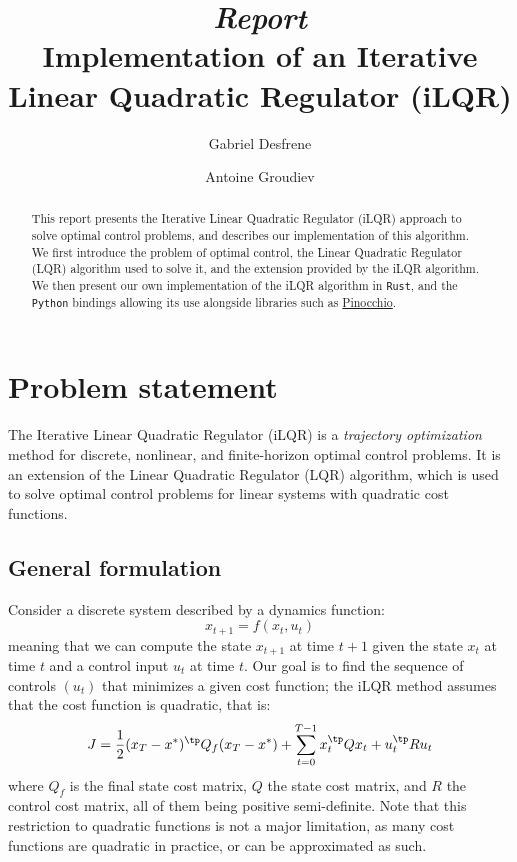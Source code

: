 \documentclass[nodate]{../cs-classes/cs-classes}
\title{\textit{Report}\\Implementation of an Iterative Linear Quadratic Regulator (iLQR)}
\author{Gabriel Desfrene\and Antoine Groudiev}
\begin{document}
\begin{abstract}
    This report presents the Iterative Linear Quadratic Regulator (iLQR) approach to solve optimal control problems, and describes our implementation of this algorithm. We first introduce the problem of optimal control, the Linear Quadratic Regulator (LQR) algorithm used to solve it, and the extension provided by the iLQR algorithm. We then present our own implementation of the iLQR algorithm in \texttt{Rust}, and the \texttt{Python} bindings allowing its use alongside libraries such as \href{https://github.com/stack-of-tasks/pinocchio/}{Pinocchio}.
\end{abstract}

\section{Problem statement}
The Iterative Linear Quadratic Regulator (iLQR) is a \emph{trajectory optimization} method for discrete, nonlinear, and finite-horizon optimal control problems. It is an extension of the Linear Quadratic Regulator (LQR) algorithm, which is used to solve optimal control problems for linear systems with quadratic cost functions.

\subsection{General formulation}
Consider a discrete system described by a dynamics function:
\begin{equation*}
    x_{t+1} = f(x_t, u_t)
\end{equation*}
meaning that we can compute the state $x_{t+1}$ at time $t+1$ given the state $x_t$ at time $t$ and a control input $u_t$ at time $t$. Our goal is to find the sequence of controls $(u_t)$ that minimizes a given cost function; the iLQR method assumes that the cost function is quadratic, that is:
\begin{equation*}
    J = \frac{1}{2}(x_T-x^*)^\tp Q_f (x_T-x^*) + \sum_{t=0}^{T-1} x_t^\tp Q x_t + u_t^\tp R u_t
\end{equation*}
where $Q_f$ is the final state cost matrix, $Q$ the state cost matrix, and $R$ the control cost matrix, all of them being positive semi-definite. Note that this restriction to quadratic functions is not a major limitation, as many cost functions are quadratic in practice, or can be approximated as such.
\end{document}
